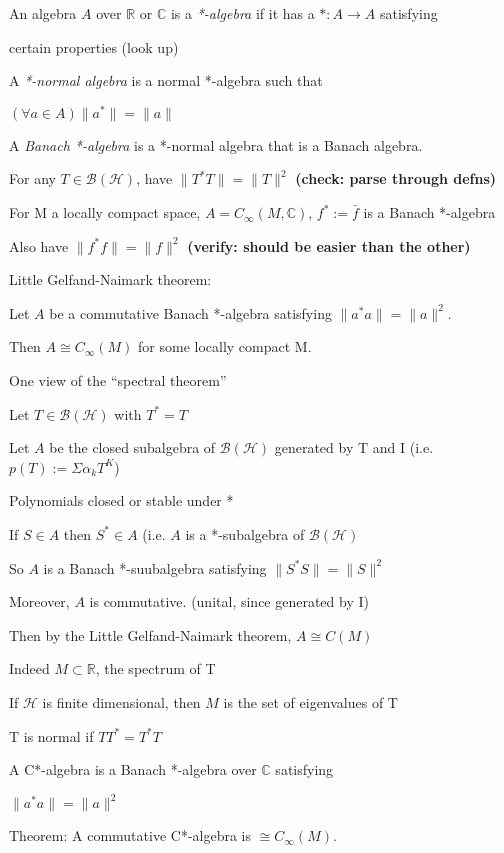 \documentclass[12pt]{article}
\begin{document}
\noindent
An algebra $A$ over $\mathds{R}$ or $\mathds{C}$ is a \textit{*-algebra} if it has a $*: A \to A$ satisfying

certain properties (look up)

\noindent
A \textit{*-normal algebra} is a normal *-algebra such that

$(\forall a \in A)\|a^*\| = \|a\|$

\noindent A \textit{Banach *-algebra} is a *-normal algebra that is a Banach algebra.

\noindent
For any $T \in \mathscr{B}(\mathscr{H})$, have $\|T^*T\| = \|T\|^2$ \textbf{(check: parse through defns)}

\noindent
For M a locally compact space, $A = C_\infty(M, \mathds{C})$, $f^*:= \bar{f}$ is a Banach *-algebra

Also have $\|f^*f\| = \|f\|^2$ \textbf{(verify: should be easier than the other)}

\noindent Little Gelfand-Naimark theorem:

Let $A$ be a commutative Banach *-algebra satisfying $\|a^*a\| = \|a\|^2$.

Then $A \cong C_\infty(M)$ for some locally compact M.

\noindent
One view of the ``spectral theorem''

Let $T \in \mathscr{B}(\mathscr{H})$ with $T^* = T$

Let $A$ be the closed subalgebra of $\mathscr{B}(\mathscr{H})$ generated by T and I (i.e. $p(T) := \Sigma \alpha_kT^K$)

Polynomials closed or stable under *

If $S \in A$ then $S^* \in A$ (i.e. $A$ is a *-subalgebra of $\mathscr{B}(\mathscr{H})$

So $A$ is a Banach *-suubalgebra satisfying $\|S^*S\| = \|S\|^2$

Moreover, $A$ is commutative.  (unital, since generated by I)

Then by the Little Gelfand-Naimark theorem, $A \cong C(M)$

Indeed $M \subset \mathds{R}$, the spectrum of T

If $\mathscr{H}$ is finite dimensional, then $M$ is the set of eigenvalues of T

T is normal if $TT^* = T^*T$

\noindent
A C*-algebra is a Banach *-algebra over $\mathds{C}$ satisfying

$\|a^*a\| = \|a\|^2$

\noindent
Theorem: A commutative C*-algebra is $\cong C_\infty(M)$.
\end{document}
